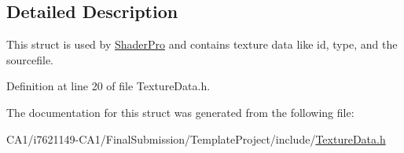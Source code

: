 \subsection{Detailed Description}
This struct is used by \hyperlink{struct_shader_pro}{Shader\-Pro} and contains texture data like id, type, and the sourcefile. 

Definition at line 20 of file Texture\-Data.\-h.



The documentation for this struct was generated from the following file\-:\begin{DoxyCompactItemize}
\item 
C\-A1/i7621149-\/\-C\-A1/\-Final\-Submission/\-Template\-Project/include/\hyperlink{_texture_data_8h}{Texture\-Data.\-h}\end{DoxyCompactItemize}

